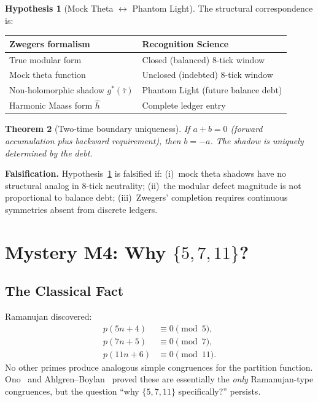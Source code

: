\documentclass[11pt]{article}
\def\leanverified{}
\def\leanhyp{}
\theoremstyle{plain}
\newtheorem{theorem}{Theorem}[section]
\theoremstyle{definition}
\newtheorem{hypothesis}[theorem]{Hypothesis}
\theoremstyle{remark}
\newcommand{\leanverified}{\textsuperscript{\textnormal{[\textsc{Lean}]}}}
\newcommand{\leanhyp}{\textsuperscript{\textnormal{[\textsc{Hyp}]}}}
\begin{document}
\begin{hypothesis}[Mock Theta $\leftrightarrow$ Phantom Light]\leanhyp\label{hyp:phantom}
The structural correspondence is:
\begin{center}
\begin{tabular}{@{}ll@{}}
\toprule
\textbf{Zwegers formalism} & \textbf{Recognition Science} \\
\midrule
True modular form & Closed (balanced) 8-tick window \\
Mock theta function & Unclosed (indebted) 8-tick window \\
Non-holomorphic shadow $g^*(\bar{\tau})$ & Phantom Light (future balance debt) \\
Harmonic Maass form $\hat{h}$ & Complete ledger entry \\
\bottomrule
\end{tabular}
\end{center}
\end{hypothesis}

\begin{theorem}[Two-time boundary uniqueness]\leanverified\label{thm:two-time}
If $a + b = 0$ (forward accumulation plus backward requirement), then $b = -a$.
The shadow is uniquely determined by the debt.
\end{theorem}

\noindent\textbf{Falsification.}\quad
Hypothesis~\ref{hyp:phantom} is falsified if:
(i)~mock theta shadows have no structural analog in 8-tick neutrality;
(ii)~the modular defect magnitude is not proportional to balance debt;
(iii)~Zwegers' completion requires continuous symmetries absent from discrete ledgers.

\section[Mystery M4: Why \{5, 7, 11\}?]{Mystery M4: Why $\{5, 7, 11\}$?}
\label{sec:congruences}

\subsection{The Classical Fact}

Ramanujan discovered:
\begin{align}
  p(5n + 4)  &\equiv 0 \pmod{5}, \label{eq:cong5}\\
  p(7n + 5)  &\equiv 0 \pmod{7}, \label{eq:cong7}\\
  p(11n + 6) &\equiv 0 \pmod{11}.\label{eq:cong11}
\end{align}
No other primes produce analogous simple congruences for the partition function.
Ono~\cite{ono2000} and Ahlgren--Boylan~\cite{ahlgrenboylan2003} proved these are essentially the \emph{only}
Ramanujan-type congruences, but the question ``why $\{5,7,11\}$ specifically?'' persists.
\end{document}
